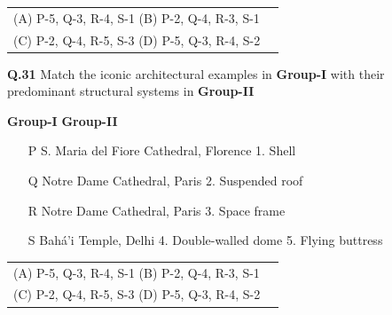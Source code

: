 \documentclass{article}
\begin{document}
 \bigskip
 
\begin{tabular}{ll}
\hspace{2cm}(A)  P-5, Q-3, R-4, S-1
\hspace{4cm}(B)  P-2, Q-4, R-3, S-1 \\  \vspace{0.5cm}
\hspace{2cm}(C)  P-2, Q-4, R-5, S-3 
\hspace{4cm}(D)  P-5, Q-3, R-4, S-2 
\end{tabular}


\vspace{0.5cm}

\textbf{Q.31} Match the iconic architectural examples in \textbf{Group-I} with their predominant structural systems in \textbf{Group-II}

\vspace{0.15cm}

\hspace{3cm}  \textbf{Group-I}\hspace{8cm} \textbf{Group-II} \\
\vspace{0.15cm}


\begin{enumerate}
    \item[P] \hspace{0.45cm} S. Maria del Fiore Cathedral, Florence \hspace{5cm} 1. Shell
    \item[Q] \hspace{0.45cm} Notre Dame Cathedral, Paris \hspace{6.4cm} 2. Suspended roof
    \item[R] \hspace{0.45cm} Notre Dame Cathedral, Paris \hspace{6.4cm} 3. Space frame
    \item[S] \hspace{0.45cm}  Bahá’i Temple, Delhi \hspace{7.6cm} 4. Double-walled dome \hspace{11cm} 5. Flying buttress
\end{enumerate}
 \bigskip
 
\begin{tabular}{ll}
\hspace{2cm}(A)  P-5, Q-3, R-4, S-1
\hspace{4cm}(B)  P-2, Q-4, R-3, S-1 \\  \vspace{0.5cm}
\hspace{2cm}(C)  P-2, Q-4, R-5, S-3 
\hspace{4cm}(D)  P-5, Q-3, R-4, S-2 
\end{tabular}
\end{document}
